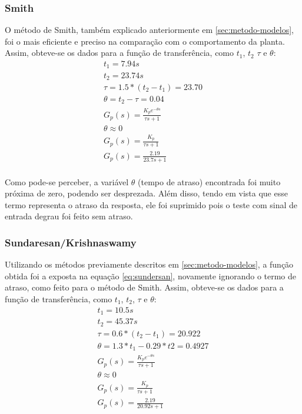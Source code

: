 \documentclass[
	article,			%
	11pt,				%
	oneside,			%
	a4paper,			%
	section=TITLE,		%
	english,			%
	brazil,				%
	sumario=tradicional
	]{abntex2}
\begin{document}

\subsubsection{Smith}
O método de Smith, também explicado anteriormente em \ref{sec:metodo-modelos}, foi o mais eficiente e preciso na comparação com o comportamento da planta. Assim, obteve-se os dados para a função de transferência, como $t_1$, $t_2$ $\tau$ e $\theta$:
\begin{equation}
\begin{split}
    t_1 = 7.94 s \\
    t_2 = 23.74 s \\
    \tau = 1.5* ( t_2 - t_1) = 23.70 \\
    \theta = t_2 - \tau = 0.04 \\
    G_p(s) = \frac{K_p e^{-\theta s}}{\tau s + 1} \\
    \theta \approx 0 \\
    G_p(s) = \frac{K_p}{\tau s + 1} \\
    G_p(s) = \frac{2.19}{23.7 s + 1} \\
\end{split}
\end{equation}

Como pode-se perceber, a variável $\theta$ (tempo de atraso) encontrada foi muito próxima de zero, podendo ser desprezada. Além disso, tendo em vista que esse termo representa o atraso da resposta, ele foi suprimido pois o teste com sinal de entrada degrau foi feito sem atraso.

\subsubsection{Sundaresan/Krishnaswamy}
Utilizando os métodos previamente descritos em \ref{sec:metodo-modelos}, a função obtida foi a exposta na equação \ref{eq:sundersan}, novamente ignorando o termo de atraso, como feito para o método de Smith. Assim, obteve-se os dados para a função de transferência, como $t_1$, $t_2$, $\tau$ e $\theta$:
\begin{equation}
\begin{split}
    t_1 = 10.5 s \\
    t_2 = 45.37 s \\
    \tau = 0.6* ( t_2 - t_1) = 20.922  \\
    \theta = 1.3*t_1 - 0.29*t2 = 0.4927 \\
    G_p(s) = \frac{K_p e^{-\theta s}}{\tau s + 1} \\
    \theta \approx 0 \\ 
    G_p(s) = \frac{K_p}{\tau s + 1} \\
    G_p(s) = \frac{2.19}{20.92 s + 1}
\end{split}
\label{eq:sundersan}
\end{equation}
\end{document}
